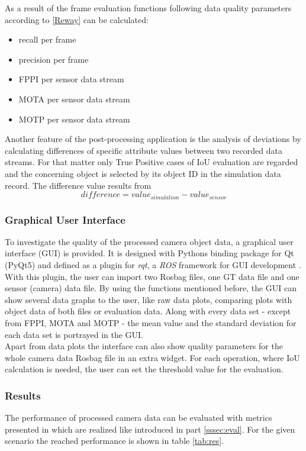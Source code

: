 As a result of the frame evaluation functions following data quality parameters according to \ref{Reway} can be calculated:
\begin{itemize}
	
	\item recall per frame
	\item precision per frame
	\item FPPI per sensor data stream 
	\item MOTA per sensor data stream 
	\item MOTP per sensor data stream 
	
\end{itemize}

Another feature of the post-processing application is the analysis of deviations by calculating differences of specific attribute values between two recorded data streams. For that matter only True Positive cases of IoU evaluation are regarded and the concerning object is selected by its object ID in the simulation data record. The difference value results from
\begin{equation}
	difference = value_{simulation} - value_{sensor} 
	\label{eq:diff}
\end{equation}

\subsubsection{Graphical User Interface}
To investigate the quality of the processed camera object data, a graphical user interface (GUI) is provided. It is designed with Pythons binding package for Qt (PyQt5) \cite{PyQt} and defined as a plugin for \textit{rqt}, a \textit{ROS} framework for GUI development \cite{rqt}.
With this plugin, the user can import two Rosbag files, one GT data file and one sensor (camera) data file.
By using the functions mentioned before, the GUI can show several data graphs to the user, like raw data plots, comparing plots with object data of both files or evaluation data. 
Along with every data set - except from FPPI, MOTA and MOTP - the mean value and the standard deviation for each data set is portrayed in the GUI. \\
Apart from data plots the interface can also show quality parameters for the whole camera data Rosbag file in an extra widget. For each operation, where IoU calculation is needed, the user can set the threshold value for the evaluation. \\

\subsubsection{Results}
The performance of processed camera data can be evaluated with metrics presented in \cite{Reway} which are realized like introduced in part \ref{sssec:eval}. For the given scenario the reached performance is shown in table \ref{tab:res}.

